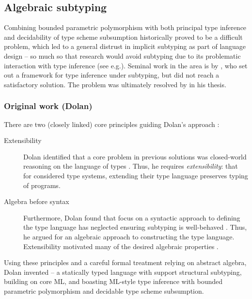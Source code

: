 \subsection{Algebraic subtyping}
\label{subsec:algebraic-subtyping-background}

Combining bounded parametric polymorphism with both principal type inference and decidability of type scheme subsumption historically proved to be a difficult problem, which led to a general distrust in implicit subtyping as part of language design \cite{mlstruct} -- so much so that research would avoid subtyping due to its problematic interaction with type inference (see e.g.\@ \cite[Section~3.5]{linear-haskell}). Seminal work in the area is by \textcite{pottier-thesis}, who set out a framework for type inference under subtyping, but did not reach a satisfactory solution. The problem was ultimately resolved by \textcite{dolan-thesis} in his thesis.

\subsubsection{Original work (Dolan)}
\label{subsubsec:dolan}

There are two (closely linked) core principles guiding Dolan's approach \cite[Section~1.3]{dolan-thesis}: \begin{description}
    \item[Extensibility] Dolan identified that a core problem in previous solutions was closed-world reasoning on the language of types \cite[Section~1.3.1]{dolan-thesis}. Thus, he requires \emph{extensibility}: that for considered type systems, extending their type language preserves typing of programs.
    \item[Algebra before syntax] Furthermore, Dolan found that focus on a syntactic approach to defining the type language has neglected ensuring subtyping is well-behaved \cite[Section~1.3.2]{dolan-thesis}. Thus, he argued for an algebraic approach to constructing the type language. Extensibility motivated many of the desired algebraic properties \cite[Section~2.1.5]{dolan-thesis}.
\end{description}
Using these principles and a careful formal treatment relying on abstract algebra, Dolan invented \mlsub{} -- a statically typed language with support structural subtyping, building on core ML, and boasting ML-style type inference with bounded parametric polymorphism and decidable type scheme subsumption.

